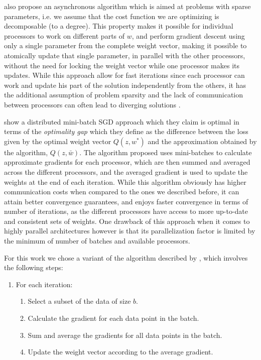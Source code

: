 \documentclass[11pt,a4paper]{article}
\begin{document}
\cite{recht2011hogwild} also propose an asynchronous algorithm which is aimed at problems with sparse parameters, i.e.
we assume that the cost function we are optimizing is decomposable (to a degree). This property makes it possible for
individual processors to work on different parts of $w$, and perform gradient descent using only a single parameter
from the complete weight vector, making it possible to atomically update that single parameter, in parallel with
the other processors, without the need for locking the weight vector while one processor makes its updates.
While this approach allow for fast iterations since each processor can work and update his part of the solution
independently from the others, it has the additional assumption of problem sparsity and the lack of communication
between processors can often lead to diverging solutions \cite{dai2015analysis}.

\cite{dekel2012optimal} show a distributed mini-batch SGD approach which they claim is optimal in terms of the
\textit{optimality gap} which they define as the difference between the loss given by the optimal weight vector
$Q(z, w^*)$ and the approximation obtained by the algorithm, $Q(z, \bar{w})$. The algorithm proposed uses
mini-batches to calculate approximate gradients for each processor, which are then summed and averaged across the
different processors, and the averaged gradient is used to update the weights at the end of each iteration.
While this algorithm obviously has higher communication costs when compared to the ones we described before,
it can attain better convergence guarantees, and enjoys faster convergence in terms of number of iterations,
as the different processors have access to more up-to-date and consistent sets of weights.
One drawback of this approach when it comes to highly parallel architectures however is that its parallelization
factor is limited by the minimum of number of batches and available processors.

For this work we chose a variant of the algorithm described by \cite{dekel2012optimal}, which involves the following steps:
\begin{enumerate}
	\item  	For each iteration:
	\begin{enumerate}
		\item Select a subset of the data of size $b$.
		\item Calculate the gradient for each data point in the batch.
		\item Sum and average the gradients for all data points in the batch.
		\item Update the weight vector according to the average gradient.
	\end{enumerate}
\end{enumerate}
\end{document}
